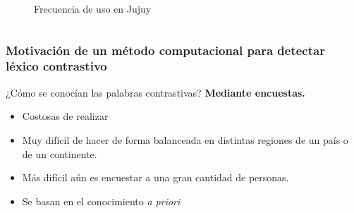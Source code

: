 \begin{frame}[t]
\begin{columns}[t]
\begin{column}{.48\textwidth}
\begin{figure}
                \caption{Frecuencia de uso en {Jujuy}}
                \label{fig:jujuy}
            \end{figure} 
        \end{column}
    \end{columns}

\end{frame}

\begin{frame}[t]\frametitle{Motivación de un método computacional para detectar léxico contrastivo}
    
    ¿Cómo se conocían las palabras contrastivas?
    \textbf{Mediante encuestas.}
    \begin{itemize}
        \item Costosas de realizar
        \item Muy difícil de hacer de forma balanceada en distintas regiones de un país o de un continente.
        \item Más difícil aún es encuestar a una gran cantidad de personas.
        \item \alert{Se basan en el conocimiento \textit{a priori}}
    \end{itemize}
\end{frame}